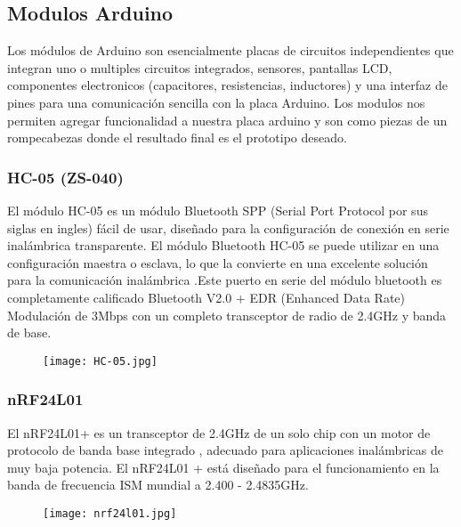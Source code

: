 \subsection{Modulos Arduino}
	\par 
		Los módulos de Arduino son esencialmente placas de circuitos independientes que integran uno o multiples circuitos integrados, sensores, pantallas LCD, componentes electronicos (capacitores, resistencias, inductores) y una interfaz de pines para una comunicación sencilla con la placa Arduino. Los modulos nos permiten agregar funcionalidad a nuestra placa arduino y son como piezas de un rompecabezas donde el resultado final es el prototipo deseado.
	
	\subsubsection{HC-05 (ZS-040)} 
		\par 
			El módulo HC-05 es un módulo Bluetooth SPP (Serial Port Protocol por sus siglas en ingles) fácil de usar, diseñado para la configuración de conexión en serie inalámbrica transparente. El módulo Bluetooth HC-05 se puede utilizar en una configuración maestra o esclava, lo que la convierte en una excelente solución para la comunicación inalámbrica .Este puerto en serie del módulo bluetooth es completamente calificado Bluetooth V2.0 + EDR (Enhanced Data Rate) Modulación de 3Mbps con un completo transceptor de radio de 2.4GHz y banda de base. 
	
		\begin{figure}[h]
			\centering
			\texttt{[image: HC-05.jpg]}
			\caption{}
		\end{figure}
	
\clearpage
\thispagestyle{plain}
	
	\subsubsection{nRF24L01}
		\par 
			El nRF24L01+ es un transceptor de 2.4GHz de un solo chip con un motor de protocolo de banda base integrado
			, adecuado para aplicaciones inalámbricas de muy baja potencia. El nRF24L01 + está diseñado
			para el funcionamiento en la banda de frecuencia ISM mundial a 2.400 - 2.4835GHz.
			
		\begin{figure}[h]
			\centering
			\texttt{[image: nrf24l01.jpg]}
			\caption{}
		\end{figure}
			
